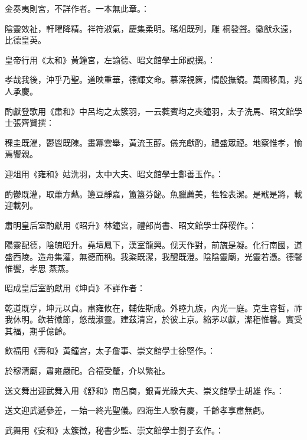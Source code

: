 \begin{pinyinscope}
 金奏夷則宮，不詳作者。一本無此章。：



 陰靈效祉，軒曜降精。祥符淑氣，慶集柔明。瑤俎既列，雕
 桐發聲。徽猷永遠，比德皇英。



 皇帝行用《太和》黃鐘宮，左諭德、昭文館學士邱說撰。：



 孝哉我後，沖乎乃聖。道映重華，德輝文命。慕深視篋，情殷撫鏡。萬國移風，兆人承慶。



 酌獻登歌用《肅和》中呂均之太簇羽，一云蕤賓均之夾鐘羽，太子洗馬、昭文館學士張齊賢撰：



 稞圭既濯，鬱鬯既陳。畫冪雲舉，黃流玉醇。儀充獻酌，禮盛眾禋。地察惟孝，愉焉饗親。



 迎俎用《雍和》姑洗羽，太中大夫、昭文館學士鄭善玉作。：



 酌鬱既灌，取蕭方爇。籩豆靜嘉，簠簋芬飶。魚臘薦美，牲牷表潔。是戢是將，載迎載列。



 肅明皇后室酌獻用《昭升》林鐘宮，禮部尚書、昭文館學士薛稷作。：



 陽靈配德，陰魄昭升。堯壇鳳下，漢室龍興。伣天作對，前旒是凝。化行南國，道盛西陵。造舟集灌，無德而稱。我粢既潔，我醴既澄。陰陰靈廟，光靈若憑。德馨惟饗，孝思
 蒸蒸。



 昭成皇后室酌獻用《坤貞》不詳作者：



 乾道既亨，坤元以貞。肅雍攸在，輔佐斯成。外睦九族，內光一庭。克生睿哲，祚我休明。欽若徽節，悠哉淑靈。建茲清宮，於彼上京。縮茅以獻，潔秬惟馨。實受其福，期乎億齡。



 飲福用《壽和》黃鐘宮，太子詹事、崇文館學士徐堅作。：



 於穆清廟，肅雍嚴祀。合福受釐，介以繁祉。



 送文舞出迎武舞入用《舒和》南呂商，銀青光祿大夫、崇文館學士胡雄
 作。：



 送文迎武遞參差，一始一終光聖儀。四海生人歌有慶，千齡孝享肅無虧。



 武舞用《安和》太簇徵，秘書少監、崇文館學士劉子玄作。：




\end{pinyinscope}
